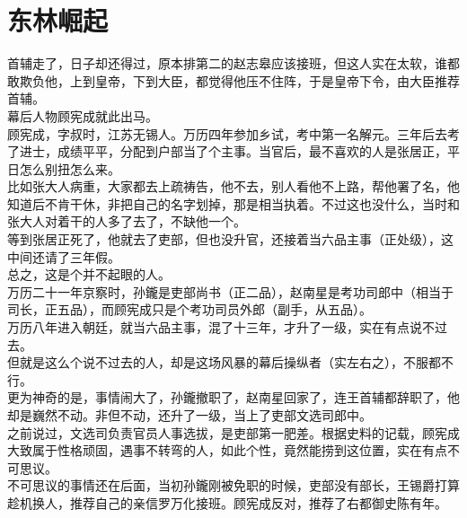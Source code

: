 \section{东林崛起}
\ifnum{}
	\begin{multicols}{\theparacolNo}
\fi
首辅走了，日子却还得过，原本排第二的赵志皋应该接班，但这人实在太软，谁都敢欺负他，上到皇帝，下到大臣，都觉得他压不住阵，于是皇帝下令，由大臣推荐首辅。\\

幕后人物顾宪成就此出马。\\

顾宪成，字叔时，江苏无锡人。万历四年参加乡试，考中第一名解元。三年后去考了进士，成绩平平，分配到户部当了个主事。当官后，最不喜欢的人是张居正，平日怎么别扭怎么来。\\

比如张大人病重，大家都去上疏祷告，他不去，别人看他不上路，帮他署了名，他知道后不肯干休，非把自己的名字划掉，那是相当执着。不过这也没什么，当时和张大人对着干的人多了去了，不缺他一个。\\

等到张居正死了，他就去了吏部，但也没升官，还接着当六品主事（正处级），这中间还请了三年假。\\

总之，这是个并不起眼的人。\\

万历二十一年京察时，孙鑨是吏部尚书（正二品），赵南星是考功司郎中（相当于司长，正五品），而顾宪成只是个考功司员外郎（副手，从五品）。\\

万历八年进入朝廷，就当六品主事，混了十三年，才升了一级，实在有点说不过去。\\

但就是这么个说不过去的人，却是这场风暴的幕后操纵者（实左右之），不服都不行。\\

更为神奇的是，事情闹大了，孙鑨撤职了，赵南星回家了，连王首辅都辞职了，他却是巍然不动。非但不动，还升了一级，当上了吏部文选司郎中。\\

之前说过，文选司负责官员人事选拔，是吏部第一肥差。根据史料的记载，顾宪成大致属于性格顽固，遇事不转弯的人，如此个性，竟然能捞到这位置，实在有点不可思议。\\

不可思议的事情还在后面，当初孙鑨刚被免职的时候，吏部没有部长，王锡爵打算趁机换人，推荐自己的亲信罗万化接班。顾宪成反对，推荐了右都御史陈有年。\\


\end{multicols}
